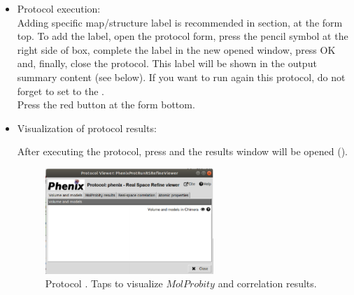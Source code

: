 \begin{itemize}
 \item Protocol execution:\\
 Adding specific map/structure label is recommended in  section, at the form top. To add the label, open the protocol form, press the pencil symbol at the right side of  box, complete the label in the new opened window, press OK and, finally, close the protocol. This label will be shown in the output summary content (see below). If you want to run again this protocol, do not forget to set to  the .\\
  Press the  red button at the form bottom.
  
 \item Visualization of protocol results:
 
 After executing the protocol, press  and the results window will be opened (). 
  
    \begin{figure}[H]
     \centering 
     \captionsetup{width=.7\linewidth} 
     \includegraphics[width=0.60\textwidth]{Images_appendix/Fig149.pdf}
     \caption{Protocol . Taps to visualize $MolProbity$  and  correlation results.}
     \label{fig:app_protocol_real_space_refine_2}
    \end{figure}
    

\end{itemize}
